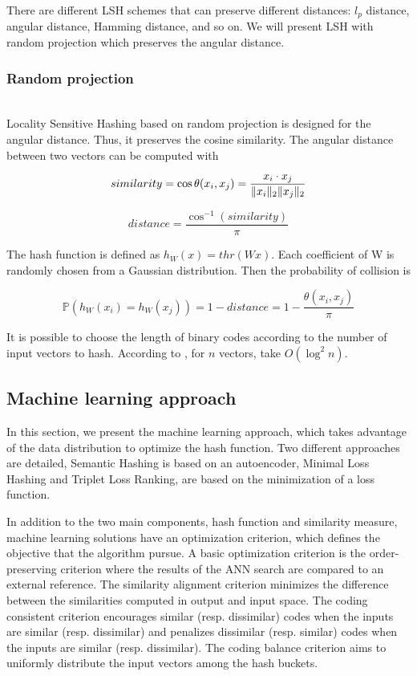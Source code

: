 There are different LSH schemes that can preserve different distances: $l_p$ distance, angular distance, Hamming distance, and so on. We will present LSH with random projection which preserves the angular distance.

\subsubsection{Random projection}
~\\
Locality Sensitive Hashing based on random projection \cite{charikar2002similarity} is designed for the angular distance. Thus, it preserves the cosine similarity. The angular distance between two vectors can be computed with

\[similarity=\cos{\theta{}(x_i, x_j)}=\frac{x_i\cdot{}x_j}{\lVert x_i\rVert_2\lVert x_j\rVert_2}\]

\[distance=\frac{\cos^{-1}(similarity)}{\pi}\]

The hash function is defined as $h_W(x)=thr(Wx)$. Each coefficient of W is randomly chosen from a Gaussian distribution. Then the probability of collision is 

\[\mathbb{P}(h_W(x_i)=h_W(x_j))=1-distance=1-\frac{\theta{}(x_i, x_j)}{\pi}\]

It is possible to choose the length of binary codes according to the number of input vectors to hash. According to \cite{DBLP:journals/corr/WangSSJ14}, for $n$ vectors, take $O(\log^2{n})$.

\subsection{Machine learning approach}
In this section, we present the machine learning approach, which takes advantage of the data distribution to optimize the hash function. Two different approaches are detailed, Semantic Hashing is based on an autoencoder, Minimal Loss Hashing and Triplet Loss Ranking, are based on the minimization of a loss function.

In addition to the two main components, hash function and similarity measure, machine learning solutions have an optimization criterion, which defines the objective that the algorithm pursue. A basic optimization criterion is the order-preserving criterion where the results of the ANN search are compared to an external reference. The similarity alignment criterion minimizes the difference between the similarities computed in output and input space. The coding consistent criterion encourages similar (resp. dissimilar) codes when the inputs are similar (resp. dissimilar) and penalizes dissimilar (resp. similar) codes when the inputs are similar (resp. dissimilar). The coding balance criterion aims to uniformly distribute the input vectors among the hash buckets.

